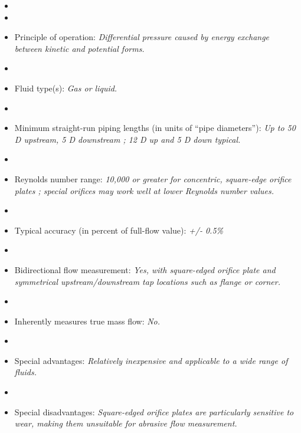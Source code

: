 \begin{itemize}
\goodbreak
\item{} 
\vskip 5pt
\item\item{} Principle of operation: {\it Differential pressure caused by energy exchange between kinetic and potential forms.}
\vskip 5pt
\item\item{} Fluid type(s): {\it Gas or liquid.}
\vskip 5pt
\item\item{} Minimum straight-run piping lengths (in units of ``pipe diameters''): {\it Up to 50 D upstream, 5 D downstream ; 12 D up and 5 D down typical.}
\vskip 5pt
\item\item{} Reynolds number range: {\it 10,000 or greater for concentric, square-edge orifice plates ; special orifices may work well at lower Reynolds number values.}
\vskip 5pt
\item\item{} Typical accuracy (in percent of full-flow value): {\it +/- 0.5\%}
\vskip 5pt
\item\item{} Bidirectional flow measurement: {\it Yes, with square-edged orifice plate and symmetrical upstream/downstream tap locations such as flange or corner.}
\vskip 5pt
\item\item{} Inherently measures true mass flow: {\it No.}
\vskip 5pt
\item\item{} Special advantages: {\it Relatively inexpensive and applicable to a wide range of fluids.}
\vskip 5pt
\item\item{} Special disadvantages: {\it Square-edged orifice plates are particularly sensitive to wear, making them unsuitable for abrasive flow measurement.}
\end{itemize}


